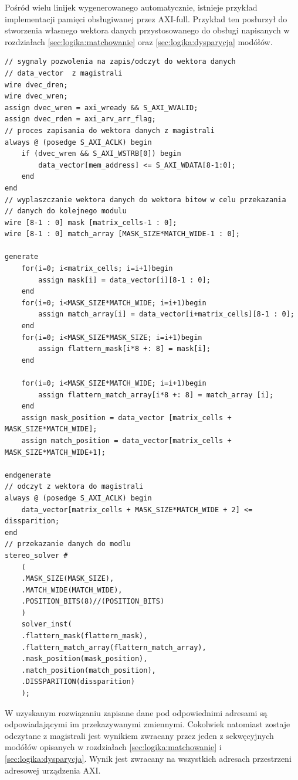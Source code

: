 Pośród wielu linijek wygenerowanego automatycznie, istnieje przykład implementacji
pamięci obsługiwanej przez AXI-full. Przykład ten posłurzył do stworzenia własnego
wektora danych przystosowanego do obsługi napisanych w rozdziałach
\ref{sec:logika:matchowanie} oraz \ref{sec:logika:dysparycja} modółów.

\begin{lstlisting}[label={lst:axifull},
    caption={fragment kodu łączący wygenerowany kod magistrali AXI-full z własnym modyłem}]
// sygnaly pozwolenia na zapis/odczyt do wektora danych
// data_vector	z magistrali
wire dvec_dren;
wire dvec_wren;
assign dvec_wren = axi_wready && S_AXI_WVALID;
assign dvec_rden = axi_arv_arr_flag;
// proces zapisania do wektora danych z magistrali
always @ (posedge S_AXI_ACLK) begin
    if (dvec_wren && S_AXI_WSTRB[0]) begin
        data_vector[mem_address] <= S_AXI_WDATA[8-1:0];
    end
end
// wyplaszczanie wektora danych do wektora bitow w celu przekazania
// danych do kolejnego modulu
wire [8-1 : 0] mask [matrix_cells-1 : 0];
wire [8-1 : 0] match_array [MASK_SIZE*MATCH_WIDE-1 : 0];
   
generate
    for(i=0; i<matrix_cells; i=i+1)begin
        assign mask[i] = data_vector[i][8-1 : 0];
    end
    for(i=0; i<MASK_SIZE*MATCH_WIDE; i=i+1)begin
        assign match_array[i] = data_vector[i+matrix_cells][8-1 : 0];
    end
    for(i=0; i<MASK_SIZE*MASK_SIZE; i=i+1)begin
    	assign flattern_mask[i*8 +: 8] = mask[i];
    end
 
    for(i=0; i<MASK_SIZE*MATCH_WIDE; i=i+1)begin
        assign flattern_match_array[i*8 +: 8] = match_array [i];
    end
    assign mask_position = data_vector [matrix_cells + MASK_SIZE*MATCH_WIDE];
    assign match_position = data_vector[matrix_cells + MASK_SIZE*MATCH_WIDE+1];

endgenerate
// odczyt z wektora do magistrali
always @ (posedge S_AXI_ACLK) begin
    data_vector[matrix_cells + MASK_SIZE*MATCH_WIDE + 2] <= dissparition;
end
// przekazanie danych do modlu
stereo_solver #
    (
    .MASK_SIZE(MASK_SIZE),
    .MATCH_WIDE(MATCH_WIDE),
    .POSITION_BITS(8)//(POSITION_BITS)
    )
    solver_inst(
    .flattern_mask(flattern_mask),
    .flattern_match_array(flattern_match_array),
    .mask_position(mask_position),
    .match_position(match_position),
    .DISSPARITION(dissparition)
    );
\end{lstlisting}

W uzyskanym rozwiązaniu zapisane dane pod odpowiednimi adresami są odpowiadającymi im
przekazywanymi zmiennymi. Cokolwiek natomiast zostaje odczytane z magistrali
jest wynikiem zwracany przez jeden z sekwęcyjnych modółów opisanych w rozdziałach
\ref{sec:logika:matchowanie} i \ref{sec:logika:dysparycja}.
Wynik jest zwracany na wszystkich adresach przestrzeni adresowej urządzenia AXI.


